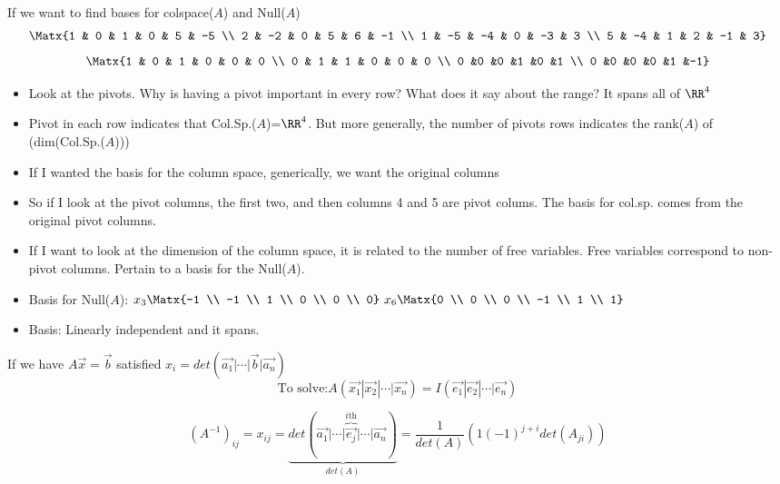 
If we want to find bases for colspace($A$) and Null($A$)
\[ \Matx{1 & 0 & 1 & 0 & 5 & -5 \\ 2 & -2 & 0 & 5 & 6 & -1 \\ 1 & -5 & -4 & 0 & -3 & 3 \\ 5 & -4 & 1 & 2 & -1 & 3} \]
\[ \Matx{1 & 0 & 1 & 0 & 0 & 0 \\ 0 & 1 & 1 & 0 & 0 & 0 \\ 0 &0 &0 &1 &0 &1 \\ 0 &0 &0 &0 &1 &-1} \]
\begin{itemize}
\item Look at the pivots. Why is having a pivot important in every row? What does it say about the range? It spans all of $\RR^4$
\item Pivot in each row indicates that Col.Sp.($A$)=$\RR^4$. But more generally, the number of pivots rows indicates the rank($A$) of (dim(Col.Sp.($A$)))
\item If I wanted the basis for the column space, generically, we want the original columns
\item So if I look at the pivot columns, the first two, and then columns 4 and 5 are pivot colums. The basis for col.sp. comes from the original pivot columns.
\item If I want to look at the dimension of the column space, it is related to the number of free variables. Free variables correspond to non-pivot columns. Pertain to a basis for the Null($A$).
\item Basis for Null($A$): $x_3\Matx{-1 \\ -1 \\ 1 \\ 0 \\ 0 \\ 0}\ x_6\Matx{0 \\ 0 \\ 0 \\ -1 \\ 1 \\ 1}$
\item Basis: Linearly independent and it spans.
\end{itemize}

If we have $A\vec{x}=\vec{b}$ satisfied $x_i=det(\vec{a_1}|\cdots|\vec{b}|\vec{a_n})$
\[ \text{To solve:} A \left( \vec{x_1}|\vec{x_2}|\cdots|\vec{x_n} \right) =I(\vec{e_1}|\vec{e_2}|\cdots|\vec{e_n}) \]

\[ (A^{-1})_{ij} = x_{ij}=\underbrace{det\left(\vec{a_1}|\cdots|\overbrace{\vec{e_j}}^{i\text{th}}|\cdots|\vec{a_n}\right)}_{det(A)} = \frac{1}{det(A)}\left( 1(-1)^{j+i}det(A_{ji})\right)\]

